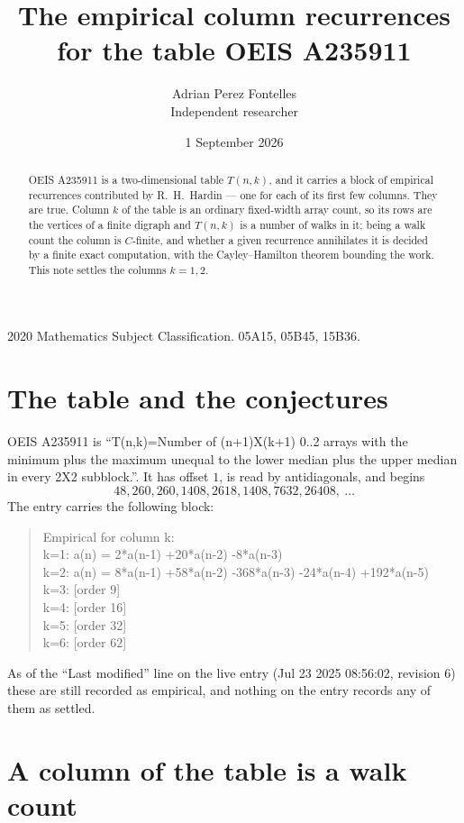 \documentclass[11pt,a4paper]{article}
\title{The empirical column recurrences for the table OEIS A235911}
\author{Adrian Perez Fontelles\\ \small Independent researcher}
\date{1 September 2026}
\theoremstyle{plain}
\theoremstyle{definition}
\begin{document}
\maketitle

\begin{abstract}
OEIS A235911 is a two-dimensional table $T(n,k)$, and it carries a block of empirical
recurrences contributed by R.~H.~Hardin --- one for each of its first few columns. They are
true. Column $k$ of the table is an ordinary fixed-width array count, so its rows are the
vertices of a finite digraph and $T(n,k)$ is a number of walks in it; being a walk count the
column is $C$-finite, and whether a given recurrence annihilates it is decided by a finite
exact computation, with the Cayley--Hamilton theorem bounding the work. This note settles the columns $k=1, 2$.
\end{abstract}

\noindent\small 2020 Mathematics Subject Classification. 05A15, 05B45, 15B36.\normalsize

\section{The table and the conjectures}

OEIS A235911 is ``T(n,k)=Number of (n+1)X(k+1) 0..2 arrays with the minimum plus the maximum unequal to the lower median plus the upper median in every 2X2 subblock.''. It has offset $1$, is
read by antidiagonals, and begins
\[
48, 260, 260, 1408, 2618, 1408, 7632, 26408,\ \dots
\]
The entry carries the following block:
\begin{quote}\small
Empirical for column k:\\
k=1: a(n) = 2*a(n-1) +20*a(n-2) -8*a(n-3)\\
k=2: a(n) = 8*a(n-1) +58*a(n-2) -368*a(n-3) -24*a(n-4) +192*a(n-5)\\
k=3: [order 9]\\
k=4: [order 16]\\
k=5: [order 32]\\
k=6: [order 62]\\
\end{quote}
As of the ``Last modified'' line on the live entry (Jul 23 2025 08:56:02, revision 6) these are still
recorded as empirical, and nothing on the entry records any of them as settled.

\section{A column of the table is a walk count}
\end{document}
